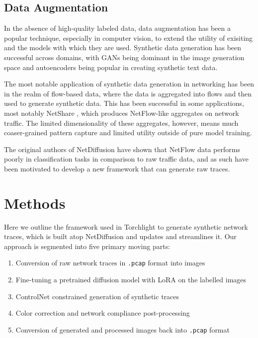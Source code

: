 \documentclass[sigconf, nonacm]{acmart}
\begin{document}
\subsection{Data Augmentation}
In the absence of high-quality labeled data, data augmentation has been a popular
technique, especially in computer vision, to extend the utility of exisiting
and the models with which they are used. Synthetic data generation has been
successful across domains, with GANs being dominant in the image generation space
and autoencoders being popular in creating synthetic text data. 

The most notable application of synthetic data generation in networking has been
in the realm of flow-based data, where the data is aggregated into flows and then
used to generate synthetic data. This has been successful in some applications, 
most notably NetShare \cite{netshare-sigcomm2022}, which produces NetFlow-like aggregates 
on network traffic. The limited dimensionality of these aggregates, however, 
means much coaser-grained pattern capture and limited utility outside of 
pure model training.

The original authors of NetDiffusion \cite{jiang2024netdiffusion} have shown that
NetFlow data performs poorly in classification tasks in comparison to raw 
traffic data, and as such have been motivated to develop a new framework
that can generate raw traces.

\section{Methods}
Here we outline the framework used in Torchlight to generate synthetic network traces,
which is built atop NetDiffusion \cite{jiang2024netdiffusion} and updates and streamlines it.
Our approach is segmented into five primary moving parts:

\begin{enumerate}
  \item Conversion of raw network traces in \verb|.pcap| format into images
  \item Fine-tuning a pretrained diffusion model with LoRA on the labelled images
  \item ControlNet constrained generation of synthetic traces
  \item Color correction and network compliance post-processing
  \item Conversion of generated and processed images back into \verb|.pcap| format
\end{enumerate}
\end{document}
